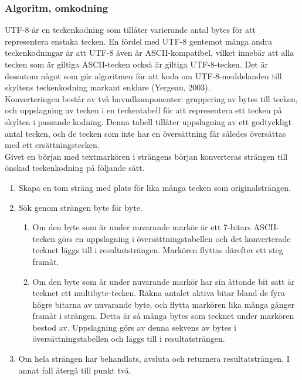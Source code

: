\documentclass[a4paper,11pt]{article}
\begin{document}
\subsubsection{Algoritm, omkodning}
UTF-8 är en teckenkodning som tillåter varierande antal bytes för att representera enstaka tecken. En fördel med UTF-8 gentemot många andra teckenkodningar är att UTF-8 även är ASCII-kompatibel, vilket innebär att alla tecken som är giltiga ASCII-tecken också är giltiga UTF-8-tecken. Det är dessutom något som gör algoritmen för att koda om UTF-8-meddelanden till skyltens teckenkodning markant enklare (Yergeau, 2003).\\

Konverteringen består av två huvudkomponenter: gruppering av bytes till tecken, och uppslagning av tecken i en teckentabell för att representera ett tecken på skylten i passande kodning. Denna tabell tillåter uppslagning av ett godtyckligt antal tecken, och de tecken som inte har en översättning får således översättas med ett ersättningstecken.\\

Givet en början med textmarkören i strängens början konverteras strängen till önskad teckenkodning på följande sätt.
	
	\begin{enumerate}
    	\item Skapa en tom sträng med plats för lika många tecken som originalsträngen.
    	\item Sök genom strängen byte för byte.
    		\begin{enumerate}
        	\item Om den byte som är under nuvarande markör är ett 7-bitars ASCII-tecken görs en uppslagning i översättningstabellen och det konverterade tecknet läggs till i resultatsträngen. Markören flyttas därefter ett steg framåt.
        	\item Om den byte som är under nuvarande markör har sin åttonde bit satt är tecknet ett multibyte-tecken. Räkna antalet aktiva bitar bland de fyra högre bitarna av nuvarande byte, och flytta markören lika många gånger framåt i strängen. Detta är så många bytes som tecknet under markören bestod av. Uppslagning görs av denna sekvens av bytes i översättningstabellen och läggs till i resultatsträngen.
        	\end{enumerate}
    	\item Om hela strängen har behandlats, avsluta och returnera resultatsträngen. I annat fall återgå till punkt två.
	\end{enumerate}
	
\end{document}
